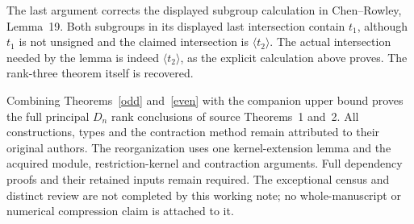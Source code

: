 \documentclass[11pt,a4paper]{article}
\newcommand{\gen}[1]{\langle#1\rangle}
\begin{document}
The last argument corrects the displayed subgroup calculation in
Chen--Rowley, Lemma~19. Both subgroups in its displayed last
intersection contain $t_1$, although $t_1$ is not unsigned and the
claimed intersection is $\gen{t_2}$. The actual intersection needed
by the lemma is indeed $\gen{t_2}$, as the explicit calculation above
proves. The rank-three theorem itself is recovered.

Combining Theorems~\ref{odd} and~\ref{even} with the companion upper
bound proves the full principal $D_n$ rank conclusions of source
Theorems~1 and~2. All constructions, types and the contraction method
remain attributed to their original authors. The reorganization uses
one kernel-extension lemma and the acquired module, restriction-kernel
and contraction arguments. Full dependency proofs and their retained
inputs remain required. The exceptional census and distinct review
are not completed by this working note; no whole-manuscript or numerical
compression claim is attached to it.
\end{document}
